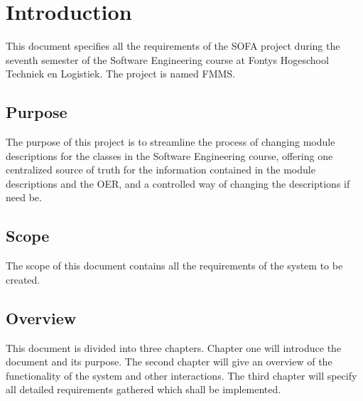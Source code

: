 \chapter{Introduction}
This document specifies all the requirements of the SOFA project during the seventh semester of the Software Engineering course at Fontys Hogeschool Techniek en Logistiek. The project is named \gls{FMMS}.

\section{Purpose}
The purpose of this project is to streamline the process of changing module descriptions for the classes in the Software Engineering course, offering one centralized source of truth for the information contained in the module descriptions and the \gls{OER}, and a controlled way of changing the descriptions if need be.

\section{Scope}
The scope of this document contains all the requirements of the system to be created.

\section{Overview}
This document is divided into three chapters. Chapter one will introduce the document and its purpose. The second chapter will give an overview of the functionality of the system and other interactions. The third chapter will specify all detailed requirements gathered which shall be implemented.